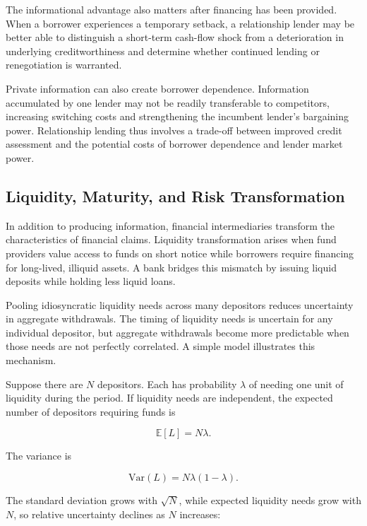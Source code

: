 The informational advantage also matters after financing has been provided. When a borrower experiences a temporary setback, a relationship lender may be better able to distinguish a short-term cash-flow shock from a deterioration in underlying creditworthiness and determine whether continued lending or renegotiation is warranted.

Private information can also create borrower dependence. Information accumulated by one lender may not be readily transferable to competitors, increasing switching costs and strengthening the incumbent lender's bargaining power. Relationship lending thus involves a trade-off between improved credit assessment and the potential costs of borrower dependence and lender market power.

\subsection{Liquidity, Maturity, and Risk Transformation}

In addition to producing information, financial intermediaries transform the characteristics of financial claims. Liquidity transformation arises when fund providers value access to funds on short notice while borrowers require financing for long-lived, illiquid assets. A bank bridges this mismatch by issuing liquid deposits while holding less liquid loans.

Pooling idiosyncratic liquidity needs across many depositors reduces uncertainty in aggregate withdrawals. The timing of liquidity needs is uncertain for any individual depositor, but aggregate withdrawals become more predictable when those needs are not perfectly correlated. A simple model illustrates this mechanism.

Suppose there are $N$ depositors. Each has probability $\lambda$ of needing one unit of liquidity during the period. If liquidity needs are independent, the expected number of depositors requiring funds is

\begin{equation}
\mathbb{E}[L]=N\lambda.
\label{eq:ch4-liquidity-expected}
\end{equation}

The variance is

\begin{equation}
\mathrm{Var}(L)=N\lambda(1-\lambda).
\label{eq:ch4-liquidity-variance}
\end{equation}

The standard deviation grows with $\sqrt{N}$, while expected liquidity needs grow with $N$, so relative uncertainty declines as $N$ increases:

